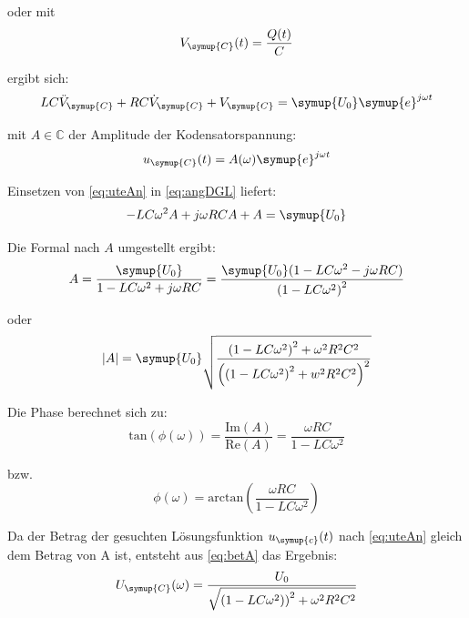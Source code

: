     \noindent oder mit
    \begin{equation}
        V_{\symup{C}} (t) = \frac{Q(t)}{C} \nonumber
    \end{equation}

    \noindent ergibt sich:
    \begin{equation}
        LC \ddot{V}_{\symup{C}} + RC \dot{V}_{\symup{C}} + V_{\symup{C}} = \symup{U_0} \symup{e}^{j \omega t} 
        \label{eq:angDGL}
    \end{equation}

    \noindent mit $A \in  \mathds{C}$ der Amplitude der Kodensatorspannung:
    \begin{equation}
        u_{\symup{C}} (t) = A(\omega) \symup{e}^{j \omega t} 
        \label{eq:uteAn}
    \end{equation}

    \noindent Einsetzen von \ref{eq:uteAn} in \ref{eq:angDGL} liefert:
    \begin{equation}
        -LC \omega^2 A + j\omega RC A +A = \symup{U_0} \nonumber
    \end{equation}

    \noindent Die Formal nach $A$ umgestellt ergibt:
    \begin{equation}
        A= \frac{\symup{U_0}}{1 - LC \omega^2 + j \omega RC} = \frac{ \symup{U_0}(1 -LC \omega^2 - j\omega RC)}{\left( 1- LC \omega^2 \right)^2} \nonumber
    \end{equation}
    
    \noindent oder
    \begin{equation}
        |A|= \symup{U_0} \sqrt{\frac{\left(1-LC\omega^2\right)^2 + \omega^2 R^2C^2}{\left( \left(1 -LC \omega^2\right)^2 +w^2R^2C^2 \right)^2}}
        \label{eq:betA}
    \end{equation}

    \noindent Die Phase berechnet sich zu:
    \begin{equation}
        \text{tan}(\phi (\omega)) = \frac{\text{Im}(A)}{\text{Re}(A)} = \frac{\omega RC}{1 - LC\omega^2} \nonumber
    \end{equation}

    \noindent bzw.
    \begin{equation}
        \phi (\omega) = \text{arctan}\left(\frac{\omega RC}{1 - LC\omega^2} \right)
        \label{eq:phi}
    \end{equation}

    \noindent Da der Betrag der gesuchten Lösungsfunktion $u_{\symup{c}}(t)$ nach \ref{eq:uteAn} gleich dem Betrag von A ist, entsteht aus 
    \ref{eq:betA} das Ergebnis:
    \begin{equation}
        U_{\symup{C}}(\omega) = \frac{U_0}{\sqrt{\left(1-LC\omega^2)\right)^2 + \omega^2 R^2 C^2}} 
        \label{eq:Ucw}
    \end{equation}

